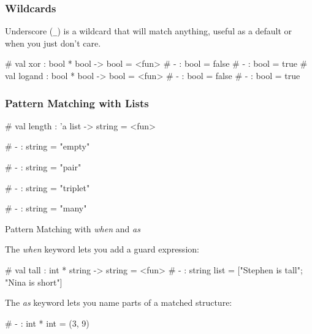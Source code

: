 \documentclass{plt}
\begin{document}
\begin{frame}[fragile]
  \frametitle{Wildcards}

Underscore (\verb|_|) is a wildcard that will match anything, useful
as a default or when you just don't care.

\begin{interactive}
# 
val xor : bool * bool -> bool = <fun>
# 
- : bool = false
# 
- : bool = true
# 
val logand : bool * bool -> bool = <fun>
# 
- : bool = false
# 
- : bool = true
\end{interactive}

\end{frame}

\begin{frame}[fragile]
  \frametitle{Pattern Matching with Lists}

\begin{interactive}
# 
val length : 'a list -> string = <fun>

# 
- : string = "empty"

# 
- : string = "pair"

# 
- : string = "triplet"

# 
- : string = "many"
\end{interactive}

\end{frame}

\begin{frame}[fragile]{Pattern Matching with \emph{when} and \emph{as}}

The \emph{when} keyword lets you add a guard expression:

\begin{interactive}
#  
val tall : int * string -> string = <fun>
# 
- : string list = ["Stephen is tall"; "Nina is short"]
\end{interactive}

The \emph{as} keyword lets you name parts of a matched structure:

\begin{interactive}
# 
- : int * int = (3, 9)
\end{interactive}

\end{frame}
\end{document}
